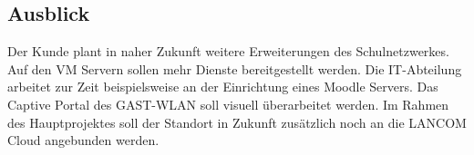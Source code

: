 \subsection{Ausblick}
\label{sec:Ausblick}
Der Kunde plant in naher Zukunft weitere Erweiterungen des Schulnetzwerkes. Auf den VM Servern sollen mehr Dienste bereitgestellt werden. Die IT-Abteilung arbeitet zur Zeit beispielsweise an der Einrichtung eines Moodle Servers. Das Captive Portal des GAST-WLAN soll visuell überarbeitet werden. Im Rahmen des Hauptprojektes soll der Standort in Zukunft zusätzlich noch an die LANCOM Cloud angebunden werden. 
\begin{comment}
	\item Wie wird sich das Projekt in Zukunft weiterentwickeln (\zB geplante Erweiterungen)?
\end{comment}

